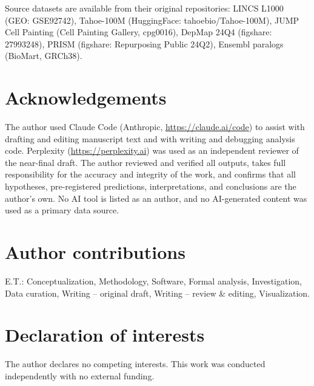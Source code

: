 \documentclass[11pt]{article}
\begin{document}
Source datasets are available from their original repositories: LINCS
L1000 (GEO: GSE92742), Tahoe-100M (HuggingFace: tahoebio/Tahoe-100M),
JUMP Cell Painting (Cell Painting Gallery, cpg0016), DepMap 24Q4
(figshare: 27993248), PRISM (figshare: Repurposing Public 24Q2),
Ensembl paralogs (BioMart, GRCh38).

\section*{Acknowledgements}

The author used Claude Code (Anthropic, \url{https://claude.ai/code}) to
assist with drafting and editing manuscript text and with writing and
debugging analysis code. Perplexity (\url{https://perplexity.ai}) was
used as an independent reviewer of the near-final draft. The author
reviewed and verified all outputs, takes full responsibility for the
accuracy and integrity of the work, and confirms that all hypotheses,
pre-registered predictions, interpretations, and conclusions are the
author's own. No AI tool is listed as an author, and no AI-generated
content was used as a primary data source.

\section*{Author contributions}

E.T.: Conceptualization, Methodology, Software, Formal analysis,
Investigation, Data curation, Writing -- original draft, Writing --
review \& editing, Visualization.

\section*{Declaration of interests}

The author declares no competing interests.  This work was conducted
independently with no external funding.
\end{document}

